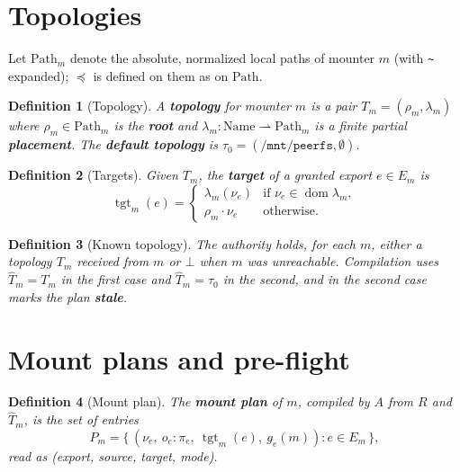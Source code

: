 \documentclass[11pt]{article}
\newcommand{\Path}{\text{Path}}
\DeclareMathOperator{\tgt}{tgt}
\DeclareMathOperator{\dom}{dom}
\newcommand{\Name}{\text{Name}}
\theoremstyle{definitionbreak}
\newtheorem{definition}{Definition}[section]
\theoremstyle{plainbreak}
\theoremstyle{remarkbreak}
\begin{document}
\section{Topologies}

Let $\Path_m$ denote the absolute, normalized local paths of mounter $m$ (with \texttt{\textasciitilde}
expanded); $\preceq$ is defined on them as on $\Path$.

\begin{definition}[Topology]
A \textbf{topology} for mounter $m$ is a pair $T_m = (\rho_m, \lambda_m)$ where
$\rho_m \in \Path_m$ is the \textbf{root} and $\lambda_m : \Name \rightharpoonup \Path_m$ is a
finite partial \textbf{placement}. The \textbf{default topology} is
$\tau_0 = (\texttt{/mnt/peerfs}, \emptyset)$.
\end{definition}

\begin{definition}[Targets]
Given $T_m$, the \textbf{target} of a granted export $e \in E_m$ is
\[
    \tgt_m(e) =
    \begin{cases}
        \lambda_m(\nu_e) & \text{if } \nu_e \in \dom \lambda_m, \\
        \rho_m \cdot \nu_e & \text{otherwise.}
    \end{cases}
\]
\end{definition}

\begin{definition}[Known topology]
The authority holds, for each $m$, either a topology $T_m$ received from $m$ or $\bot$ when $m$
was unreachable. Compilation uses $\hat T_m = T_m$ in the first case and $\hat T_m = \tau_0$ in
the second, and in the second case marks the plan \textbf{stale}.
\end{definition}

\section{Mount plans and pre-flight}

\begin{definition}[Mount plan]
The \textbf{mount plan} of $m$, compiled by $A$ from $R$ and $\hat T_m$, is the set of entries
\[
    P_m = \{\, (\nu_e,\ o_e{:}\pi_e,\ \tgt_m(e),\ g_e(m)) : e \in E_m \,\},
\]
read as (export, source, target, mode).
\end{definition}
\end{document}
